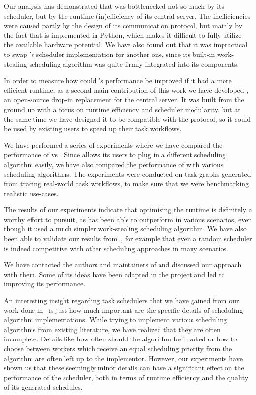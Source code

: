 Our analysis has demonstrated that \dask{} was bottlenecked not so much by its
scheduler, but by the runtime (in)efficiency of its central server. The inefficiencies were caused
partly by the design of its communication protocol, but mainly by the fact that
\dask{} is implemented in Python, which makes it difficult to fully utilize the
available hardware potential. We have also found out that it was impractical to swap
\dask{}'s scheduler implementation for another one, since its built-in
work-stealing scheduling algorithm was quite firmly integrated into its components.

In order to measure how could \dask{}'s performance be improved if it had a more
efficient runtime, as a second main contribution of this work we have developed
\rsds{}, an open-source drop-in replacement for the \dask{} central
server. It was built from the ground up with a focus on runtime efficiency
and scheduler modularity, but at the same time we have designed it to be compatible with the
\dask{} protocol, so it could be used by existing \dask{} users to
speed up their task workflows.

We have performed a series of experiments where we have compared the performance of
\rsds{} vs \dask{}. Since \rsds{} allows its users
to plug in a different scheduling algorithm easily, we have also compared the performance of
\rsds{} with various scheduling algorithms. The experiments were conducted on task
graphs generated from tracing real-world \dask{} task workflows, to make sure that
we were benchmarking realistic use-cases.

The results of our experiments indicate that optimizing the runtime is definitely a worthy effort
to pursuit, as \rsds{} has been able to outperform \dask{} in
various scenarios, even though it used a much simpler work-stealing scheduling algorithm. We have
also been able to validate our results from~\cite{estee}, for example that even a random
scheduler is indeed competitive with other scheduling approaches in many scenarios.

We have contacted the authors and maintainers of \dask{} and discussed our
\rsds{} approach with
them. Some of its ideas have
been adapted in the \dask{} project and led to improving its performance.

An interesting insight regarding task schedulers that we have gained from our work done
in~\cite{estee,rsds} is just how much important are the specific details of scheduling
algorithm implementations. While trying to implement various scheduling algorithms from existing
literature, we have realized that they are often incomplete. Details like how often should the
algorithm be invoked or how to choose between workers which receive an equal scheduling priority
from the algorithm are often left up to the implementor. However, our experiments have shown us
that these seemingly minor details can have a significant effect on the performance of the
scheduler, both in terms of runtime efficiency and the quality of its generated schedules.
